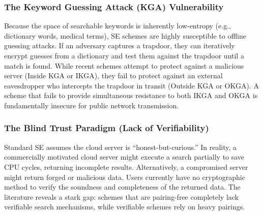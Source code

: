 \documentclass[10pt,journal,compsoc]{IEEEtran}
\begin{document}
\subsubsection{The Keyword Guessing Attack (KGA) Vulnerability}
Because the space of searchable keywords is inherently low-entropy (e.g., dictionary words, medical terms), SE schemes are highly susceptible to offline guessing attacks. If an adversary captures a trapdoor, they can iteratively encrypt guesses from a dictionary and test them against the trapdoor until a match is found. While recent schemes \cite{elhabob2020efficient} attempt to protect against a malicious server (Inside KGA or IKGA), they fail to protect against an external eavesdropper who intercepts the trapdoor in transit (Outside KGA or OKGA). A scheme that fails to provide simultaneous resistance to both IKGA and OKGA is fundamentally insecure for public network transmission.

\subsubsection{The Blind Trust Paradigm (Lack of Verifiability)}
Standard SE assumes the cloud server is ``honest-but-curious.'' In reality, a commercially motivated cloud server might execute a search partially to save CPU cycles, returning incomplete results. Alternatively, a compromised server might return forged or malicious data. Users currently have no cryptographic method to verify the soundness and completeness of the returned data. The literature reveals a stark gap: schemes that are pairing-free \cite{liu2023pairing} completely lack verifiable search mechanisms, while verifiable schemes rely on heavy pairings.
\end{document}
